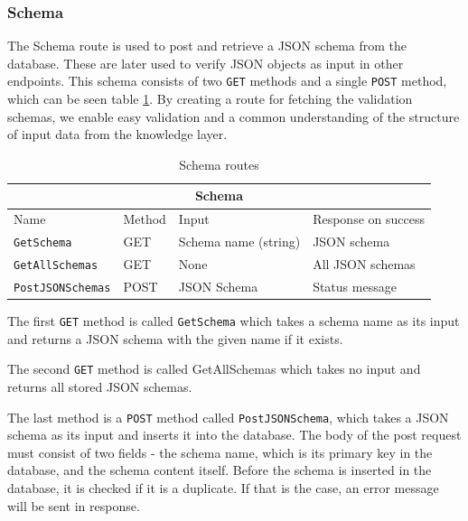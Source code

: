 \subsubsection{Schema}
The Schema route is used to post and retrieve a JSON schema from the database. These are later used to verify JSON objects as input in other endpoints. 
This schema consists of two \texttt{GET} methods and a single \texttt{POST} method, which can be seen table \ref{SchemaRoutes}.
By creating a route for fetching the validation schemas, we enable easy validation and a common understanding of the structure of input data from the knowledge layer.
\begin{table}[h]
  \centering
    \begin{tabular}{|llll|}
    \hline
    \multicolumn{4}{|c|}{\textbf{Schema}}                                                                                                     \\ \hline
    \multicolumn{1}{|l|}{Name}                     & \multicolumn{1}{l|}{Method} & \multicolumn{1}{l|}{Input}               & Response on success \\ \hline
    \multicolumn{1}{|l|}{\texttt{GetSchema}}       & \multicolumn{1}{l|}{GET}    & \multicolumn{1}{l|}{Schema name (string)} & JSON schema         \\ \hline
    \multicolumn{1}{|l|}{\texttt{GetAllSchemas}}   & \multicolumn{1}{l|}{GET}    & \multicolumn{1}{l|}{None}                & All JSON schemas    \\ \hline
    \multicolumn{1}{|l|}{\texttt{PostJSONSchemas}} & \multicolumn{1}{l|}{POST}   & \multicolumn{1}{l|}{JSON Schema}         & Status message      \\ \hline
    \end{tabular}
    \caption{Schema routes\label{SchemaRoutes}}
\end{table}

The first \texttt{GET} method is called \texttt{GetSchema} which takes a schema name as its input and returns a JSON schema with the given name if it exists. 

The second \texttt{GET} method is called GetAllSchemas which takes no input and returns all stored JSON schemas. 

The last method is a \texttt{POST} method called \texttt{PostJSONSchema}, which takes a JSON schema as its input and inserts it into the database.
The body of the post request must consist of two fields - the schema name, which is its primary key in the database, and the schema content itself. Before the schema is inserted in the database, it is checked if it is a duplicate. If that is the case, an error message will be sent in response.